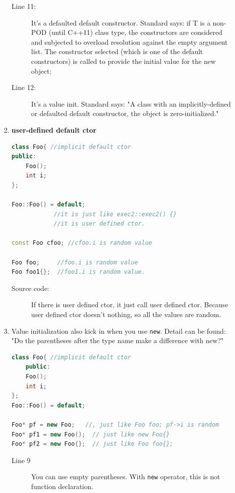 \documentclass[a4paper,11pt,twoside]{book}
\begin{document}
\begin{itemize}
\begin{enumerate}
\begin{description}
	\item[Line 11:] It's a defaulted default constructor.  Standard says: if T is a non-POD (until C++11) class type, the constructors are considered and subjected to overload resolution against the empty argument list. The constructor selected (which is one of the default constructors) is called to provide the initial value for the new object;
	
	\item[Line 12:] It's a value init. Standard says: "A class with an implicitly-defined or defaulted default constructor, the object is zero-initialized."
\end{description}


		\item \textbf{user-defined default ctor}
\begin{lstlisting}[frame=single, language=c++]
class Foo{ //implicit default ctor
public:
	Foo();
	int i;
};

Foo::Foo() = default; 
			//it is just like exec2::exec2() {}
			//it is user defined ctor.
			
const Foo cfoo; //cfoo.i is random value 
			
Foo foo;     //foo.i is random value
Foo foo1{};	 //foo1.i is random value.		 
\end{lstlisting}
\begin{description}			
	\item[Source code:] If there is user defined ctor, it just call user defined ctor. Because user defined ctor doesn't nothing, so all the values are random.
\end{description}
				
 
	\item Value initialization also kick in when you use \texttt{new}. Detail can be found: "Do the parentheses after the type name make a difference with new?"
	
\begin{lstlisting}[frame=single, language=c++]
class Foo{ //implicit default ctor
	public:
	Foo();
	int i;
};
Foo::Foo() = default; 	

Foo* pf = new Foo;   //, just like Foo foo; pf->i is random 
Foo* pf1 = new Foo();  // just like new Foo{}
Foo* pf2 = new Foo{};  // just like Foo foo{};	
\end{lstlisting}	

\begin{description}			
	\item[Line 9] You can use empty parentheses. With \texttt{new} operator, this is not function declaration. 
	

\end{description}
\end{enumerate}
\end{itemize}
\end{document}
